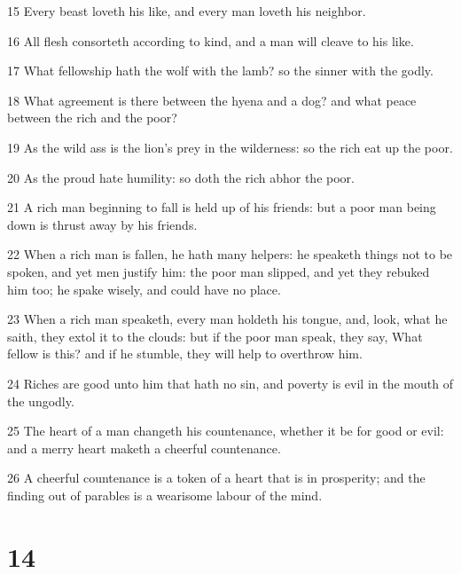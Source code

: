 \par 15 Every beast loveth his like, and every man loveth his neighbor.
\par 16 All flesh consorteth according to kind, and a man will cleave to his like.
\par 17 What fellowship hath the wolf with the lamb? so the sinner with the godly.
\par 18 What agreement is there between the hyena and a dog? and what peace between the rich and the poor?
\par 19 As the wild ass is the lion's prey in the wilderness: so the rich eat up the poor.
\par 20 As the proud hate humility: so doth the rich abhor the poor.
\par 21 A rich man beginning to fall is held up of his friends: but a poor man being down is thrust away by his friends.
\par 22 When a rich man is fallen, he hath many helpers: he speaketh things not to be spoken, and yet men justify him: the poor man slipped, and yet they rebuked him too; he spake wisely, and could have no place.
\par 23 When a rich man speaketh, every man holdeth his tongue, and, look, what he saith, they extol it to the clouds: but if the poor man speak, they say, What fellow is this? and if he stumble, they will help to overthrow him.
\par 24 Riches are good unto him that hath no sin, and poverty is evil in the mouth of the ungodly.
\par 25 The heart of a man changeth his countenance, whether it be for good or evil: and a merry heart maketh a cheerful countenance.
\par 26 A cheerful countenance is a token of a heart that is in prosperity; and the finding out of parables is a wearisome labour of the mind.

\chapter{14}

